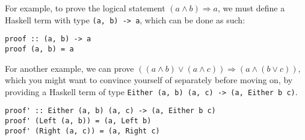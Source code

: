 \documentclass[12pt,twoside]{report}
\begin{document}
For example, to prove the logical statement $(a \wedge b) \Rightarrow a$, we must define a Haskell term with type \verb|(a, b) -> a|, which can be done as such:

\begin{lstlisting}
proof :: (a, b) -> a
proof (a, b) = a
\end{lstlisting}

For another example, we can prove $((a \wedge b) \vee (a \wedge c)) \Rightarrow (a \wedge (b \vee c))$, which you might want to convince yourself of separately before moving on, by providing a Haskell term of type \verb|Either (a, b) (a, c) -> (a, Either b c)|.

\begin{lstlisting}
proof' :: Either (a, b) (a, c) -> (a, Either b c)
proof' (Left (a, b)) = (a, Left b)
proof' (Right (a, c)) = (a, Right c)
\end{lstlisting}

\end{document}

